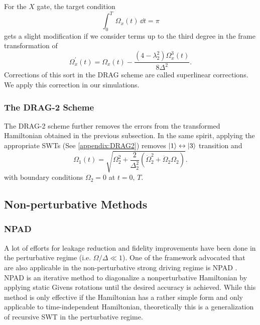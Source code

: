 For the $X$ gate, the target condition
\begin{equation}
  \int_0^T\,\Omega_x(t)\,\dd t = \pi
  \label{eq:xgate_condition}
\end{equation}
gets a slight modification if we consider terms up to the third degree in the frame transformation of 
$$
  \Omega_x^\prime(t) = \Omega_x(t) - \dfrac{(4-\lambda_2^2)\Omega_x^3(t)}{8\Delta^2}.
$$
Corrections of this sort in the DRAG scheme are called superlinear corrections.
We apply this correction in our simulations.


\subsubsection{The DRAG-2 Scheme}
The DRAG-2 scheme further removes the errors from the transformed Hamiltonian obtained in the previous subsection.
In the same spirit, applying the appropriate SWTs (See \ref{appendix:DRAG2}) removes
$\ket{1}\leftrightarrow\ket{3}$ transition and
\begin{equation}
  \Omega_1(t) = \sqrt{\Omega_2^2 + \frac{2}{\Delta_2^2} (\dot{\Omega}_2^2 + \ddot{\Omega}_2 \Omega_2)}.
  \label{eq:drag2}
\end{equation}
with boundary conditions $\Omega_2=0$ at $t=0,\,T$.

\subsection{Non-perturbative Methods}
\subsubsection{NPAD}
\label{subsec:npad}
A lot of efforts for leakage reduction and fidelity improvements have been done in the perturbative regime (i.e.
$\Omega/\Delta \ll 1$).
One of the framework advocated that are also applicable in the non-perturbative strong driving regime is NPAD
\cite{NPAD2022}.
NPAD is an iterative method to diagonalize a nonperturbative Hamiltonian by applying static Givens rotations until the desired accuracy is achieved.
While this method is only effective if the Hamiltonian has a rather simple form and only applicable to time-independent
Hamiltonian, theoretically this is a generalization of recursive SWT in the perturbative regime.

